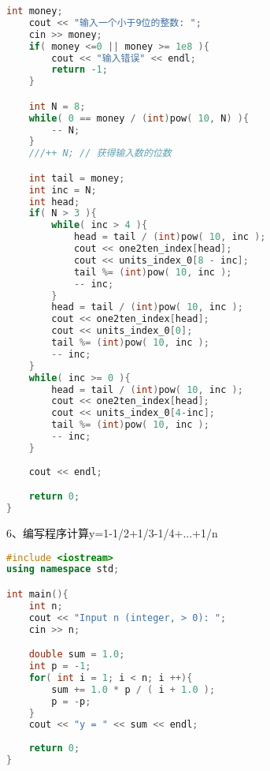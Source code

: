 \documentclass[14pt,aps,prb]{revtex4}
\begin{document}
\begin{spacing}{1.5}
\begin{lstlisting}[language=C++]
    int money;
    cout << "输入一个小于9位的整数: ";
    cin >> money;
    if( money <=0 || money >= 1e8 ){
        cout << "输入错误" << endl;
        return -1;
    }

    int N = 8;
    while( 0 == money / (int)pow( 10, N) ){
        -- N;
    }
    ///++ N; // 获得输入数的位数

    int tail = money;
    int inc = N;
    int head;
    if( N > 3 ){
        while( inc > 4 ){
            head = tail / (int)pow( 10, inc );
            cout << one2ten_index[head];
            cout << units_index_0[8 - inc];
            tail %= (int)pow( 10, inc );
            -- inc;
        }
        head = tail / (int)pow( 10, inc );
        cout << one2ten_index[head];
        cout << units_index_0[0];
        tail %= (int)pow( 10, inc );
        -- inc;
    }
    while( inc >= 0 ){
        head = tail / (int)pow( 10, inc );
        cout << one2ten_index[head];
        cout << units_index_0[4-inc];
        tail %= (int)pow( 10, inc );
        -- inc;
    }
    
    cout << endl;

    return 0;
}
\end{lstlisting}

6、编写程序计算y=1-1/2+1/3-1/4+...+1/n
\begin{lstlisting}[language=C++]
#include <iostream>
using namespace std;

int main(){
    int n;
    cout << "Input n (integer, > 0): ";
    cin >> n;

    double sum = 1.0;
    int p = -1;
    for( int i = 1; i < n; i ++){
        sum += 1.0 * p / ( i + 1.0 );
        p = -p;
    }
    cout << "y = " << sum << endl;
    
    return 0;
}
\end{lstlisting}


\end{spacing}
\end{document}
